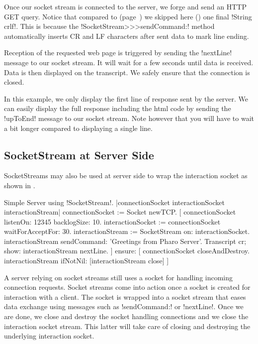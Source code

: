 \documentclass[a4paper,10pt,twoside]{book}
\begin{document}
Once our socket stream is connected to the server, we forge and send an HTTP GET query.
Notice that compared to  (page~\pageref{scr:script:closeAndDestroy}) we skipped here () one final \ct!String crlf!.
This is because the \ct!SocketStream>>>sendCommand:! method automatically inserts CR and LF characters after sent data to mark line ending.

Reception of the requested web page is triggered by sending the \ct!nextLine! message to our socket stream.
It will wait for a few seconds until data is received.
Data is then displayed on the transcript.
We safely ensure that the connection is closed.

In this example, we only display the first line of response sent by the server.
We can easily display the full response including the html code by sending the \ct!upToEnd! message to our socket stream.
Note however that you will have to wait a bit longer compared to displaying a single line.

\subsection{SocketStream at Server Side}
SocketStreams may also be used at server side to wrap the interaction socket as shown in .

\begin{script}{Simple Server using \ct!SocketStream!.}
|connectionSocket interactionSocket interactionStream|
connectionSocket := Socket newTCP. 
[
	connectionSocket listenOn: 12345 backlogSize: 10. 
	interactionSocket := connectionSocket waitForAcceptFor: 30. 
	interactionStream := SocketStream on: interactionSocket.
	interactionStream sendCommand: 'Greetings from Pharo Server'.
	Transcript cr; show: interactionStream nextLine.
] ensure: [
	connectionSocket closeAndDestroy.
	interactionStream ifNotNil: [interactionStream close]
]
\end{script}

A server relying on socket streams still uses a socket for handling incoming connection requests.
Socket streams come into action once a socket is created for interaction with a client.
The socket is wrapped into a socket stream that eases data exchange using messages such as \ct!sendCommand:! or \ct!nextLine!.
Once we are done, we close and destroy the socket handling connections and we close the interaction socket stream.
This latter will take care of closing and destroying the underlying interaction socket.
\end{document}
